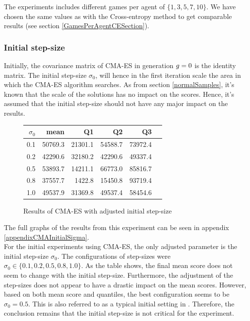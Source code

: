 The experiments includes different games per agent of $\{1,3,5,7,10\}$. We have chosen the same 
values as with the Cross-entropy method to get comparable results (see section \ref{GamesPerAgentCESection}).

\subsubsection{Initial step-size \label{sec:CMAInitialStepSize}}
Initially, the covariance matrix of CMA-ES in generation $g = 0$
is the identity matrix. The initial step-size $\sigma_0$, will hence in 
the first iteration scale the area in which the CMA-ES algorithm searches.
As from section \ref{normalSamples}, it's known that the scale of the 
solutions has no impact on the scores. Hence, it's assumed that the initial 
step-size should not have any major impact on the results.

\begin{figure}[H]
\centering
\begin{tabular}{r | r r r r r}
$\sigma_0$ & mean & Q1 & Q2 & Q3\\
\hline
0.1 & 50769.3 & 21301.1 & 54588.7 & 73972.4\\
0.2 & 42290.6 & 32180.2 & 42290.6 & 49337.4\\
0.5 & 53893.7 & 14211.1 & 66773.0 & 85816.7\\
0.8 & 37557.7 & 1422.8  & 15450.8 & 93719.4\\
1.0 & 49537.9 & 31369.8 & 49537.4 & 58454.6
\end{tabular}
\caption{Results of CMA-ES with adjusted initial step-size \label{CMAInitialSigmaConfigTest}}
\end{figure}
The full graphs of the results from this experiment can be seen in 
appendix \ref{appendixCMAInitialSigma}.\\
For the initial experiments using CMA-ES, 
the only adjusted parameter is the initial 
step-size $\sigma_0$. The configurations of step-sizes were 
$\sigma_0 \in \{0.1, 0.2, 0.5, 0.8, 1.0\}$. As the table shows,
the final mean score does not seem to change with the initial step-size.
Furthermore, the adjustment of the step-sizes does not appear to 
have a drastic impact on the mean scores. However, based on both mean score and
quantiles, the best configuration seems to be $\sigma_0 = 0.5$. This 
is also referred to as a typical initial setting in \citep{boumaza2009}.
Therefore, the conclusion remains that the initial step-size is not critical 
for the experiment.\\

